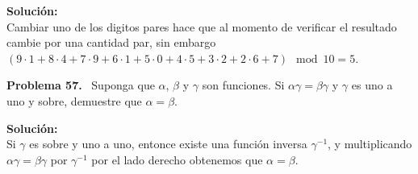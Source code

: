 \documentclass{article}
\newcounter{problem}
\newcounter{solution}
\newcommand\Problem[1]{%
  \stepcounter{problem}%
  \textbf{Problema #1.}~%
  \setcounter{solution}{0}%
}
\newcommand\TheSolution{%
  \textbf{Solución:}\\%
}
\begin{document}
\TheSolution{}
Cambiar uno de los digitos pares hace que al momento de verificar el resultado
cambie por una cantidad par, sin embargo $(9\cdot1+8\cdot4+7\cdot9+6\cdot1+5
\cdot0+4\cdot5+3\cdot2+2\cdot6+7) \mod 10 = 5$.

\Problem{57} Suponga que $\alpha$, $\beta$ y $\gamma$ son funciones. Si
$\alpha\gamma = \beta\gamma$ y $\gamma$ es uno a uno y sobre, demuestre que
$\alpha = \beta$.

\TheSolution{}
Si $\gamma$ es sobre y uno a uno, entonce existe una función inversa
$\gamma^{-1}$, y multiplicando $\alpha\gamma = \beta\gamma$ por $\gamma^{-1}$
por el lado derecho obtenemos que $\alpha = \beta$.
\end{document}

